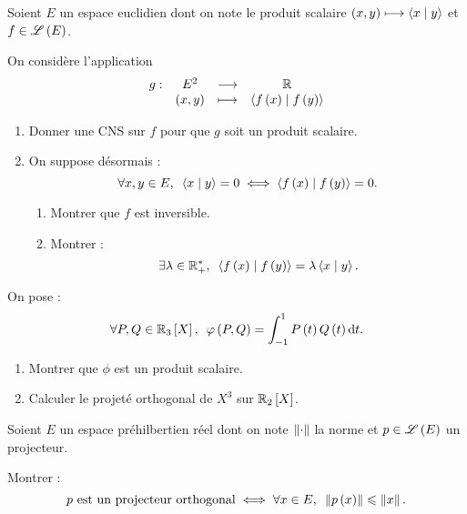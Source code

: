 \begin{corr}
\end{corr}

\begin{exo}
Soient \(E\) un espace euclidien dont on note le produit scalaire \(\left(x,y\right)\longmapsto\left\langle x\;\middle|\; y\right\rangle\) et \(f\in\mathscr{L}\left(E\right)\).

On considère l'application \[\begin{array}[t]{cccc}g : & E^2 & \longrightarrow & \mathbb{R} \\ & \left(x,y\right) & \longmapsto & \left\langle f\left(x\right)\;\middle|\; f\left(y\right)\right\rangle\end{array}\]

\begin{enumerate}
\item Donner une CNS sur \(f\) pour que \(g\) soit un produit scalaire. \\

\item On suppose désormais : \[\quantifs{\forall x,y\in E}\ps{x}{y}=0\ssi\ps{f\paren{x}}{f\paren{y}}=0.\]

\begin{enumerate}
\item Montrer que \(f\) est inversible. \\

\item Montrer : \[\quantifs{\exists\lambda\in\Rps}\ps{f\paren{x}}{f\paren{y}}=\lambda\ps{x}{y}.\]
\end{enumerate}
\end{enumerate}
\end{exo}

\begin{corr}
\end{corr}

\begin{exo}
On pose : \[\quantifs{\forall P,Q\in\polydeg[\R]{3}}\phi\paren{P,Q}=\int_{-1}^1P\paren{t}Q\paren{t}\odif{t}.\]

\begin{enumerate}
\item Montrer que \(\phi\) est un produit scalaire. \\

\item Calculer le projeté orthogonal de \(X^3\) sur \(\polydeg[\R]{2}\).
\end{enumerate}
\end{exo}

\begin{corr}
\end{corr}

\begin{exo}
Soient \(E\) un espace préhilbertien réel dont on note \(\left\|\cdot\right\|\) la norme et \(p\in\mathscr{L}\left(E\right)\) un projecteur.

Montrer : \[p\text{ est un projecteur orthogonal}\ssi\quantifs{\forall x\in E}\norme{p\paren{x}}\leq\norme{x}.\]
\end{exo}

